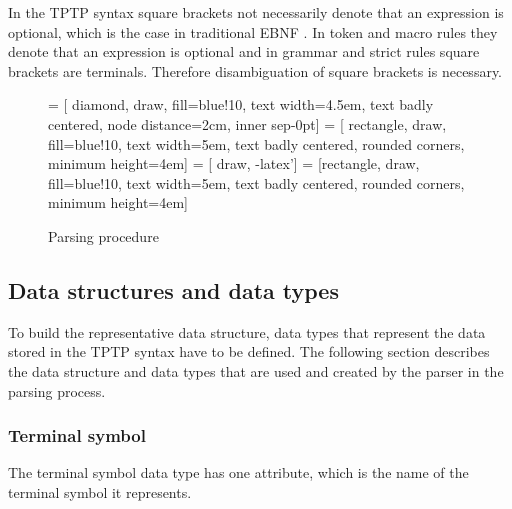 In the \ac{TPTP} syntax square brackets not necessarily denote that an expression is optional, which is the case in traditional \ac{EBNF} .
In token and macro rules they denote that an expression is optional and in grammar and strict rules square brackets are terminals.
Therefore disambiguation of square brackets is necessary.
\begin{figure}[H]
 = [ diamond, draw, fill=blue!10, text width=4.5em, text badly centered, node distance=2cm, inner sep-0pt]  
 = [ rectangle, draw, fill=blue!10, text width=5em, text badly centered, rounded corners, minimum height=4em]  
 = [ draw, -latex']  
 = [rectangle, draw, fill=blue!10, text width=5em, text badly centered, rounded corners, minimum height=4em]  
\begin{center}
\end{center}
\caption{Parsing procedure}
\label{fig:ConceptParserFlow}
\end{figure}

\subsection{Data structures and data types}\label{sec:ConceptParserDataStructure}
To build the representative data structure, data types that represent the data stored in the \ac{TPTP} syntax have to be defined.
The following section describes the data structure and data types that are used and created by the parser in the parsing process.


\subsubsection{Terminal symbol}
The terminal symbol data type has one attribute, which is the name of the terminal symbol it represents.

